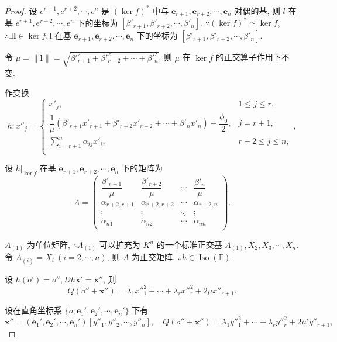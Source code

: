 \documentclass{ctexart}
\begin{document}
\begin{proof}
    设 $e^{r+1},e^{r+2},\cdots,e^n$ 是 $(\ker f)^*$ 中与 $\boldsymbol{e}_{r+1},\boldsymbol{e}_{r+2},\cdots,\boldsymbol{e}_n$ 对偶的基, 则 $l$ 在基 $e^{r+1},e^{r+2},\cdots,e^n$ 下的坐标为 $[\beta'_{r+1},\beta'_{r+2},\cdots,\beta'_n]$. $\because(\ker f)^*\simeq\ker f$, $\therefore\exists\boldsymbol{l}\in\ker f,\boldsymbol{l}$ 在基 $\boldsymbol{e}_{r+1},\boldsymbol{e}_{r+2},\cdots,\boldsymbol{e}_n$ 下的坐标为 $[\beta'_{r+1},\beta'_{r+2},\cdots,\beta'_n]$.
    
    令 $\mu=\|\boldsymbol{l}\|=\sqrt{\beta'^2_{r+1}+\beta'^2_{r+2}+\cdots+\beta'^2_n}$, 则 $\mu$ 在 $\ker f$ 的正交算子作用下不变.

    作变换
    \[h:x''_j=\begin{cases}
        x'_j, & 1\leq j\leq r, \\
        \dfrac{1}{\mu}(\beta'_{r+1}x'_{r+1}+\beta'_{r+2}x'_{r+2}+\cdots+\beta'_nx'_n)+\dfrac{\phi_0}{2}, & j=r+1, \\
        \sum\limits_{i=r+1}^n\alpha_{ij}x'_i, & r+2\leq j\leq n, \\
    \end{cases},\]

    设 $h|_{\ker f}$ 在基 $\boldsymbol{e}_{r+1},\boldsymbol{e}_{r+2},\cdots,\boldsymbol{e}_n$ 下的矩阵为
    \[A=\begin{pmatrix}
        \dfrac{\beta'_{r+1}}{\mu} & \dfrac{\beta'_{r+2}}{\mu} & \cdots & \dfrac{\beta'_n}{\mu} \\
        \alpha_{r+2,r+1} & \alpha_{r+2,r+2} & \cdots & \alpha_{r+2,n} \\
        \vdots & \vdots & \ddots & \vdots \\
        \alpha_{n1} & \alpha_{n2} & \cdots & \alpha_{nn} \\
    \end{pmatrix}.\]

    $A_{(1)}$ 为单位矩阵, $\therefore A_{(1)}$ 可以扩充为 $K^n$ 的一个标准正交基 $A_{(1)},X_2,X_3,\cdots,X_n$. 令 $A_{(i)}=X_i\ (i=2,\cdots,n)$, 则 $A$ 为正交矩阵. $\therefore h\in\operatorname{Iso}(\mathbb{E})$.

    设 $h(\dot{o}')=\dot{o}'',Dh\boldsymbol{x}'=\boldsymbol{x}''$, 则
    \[Q(\dot{o}''+\boldsymbol{x}'')=\lambda_1x''^2_1+\cdots+\lambda_rx''^2_r+2\mu x''_{r+1}.\]

    设在直角坐标系 $\{\dot{o},\boldsymbol{e}_1',\boldsymbol{e}_2',\cdots,\boldsymbol{e}_n'\}$ 下有
    \[\boldsymbol{x}''=(\boldsymbol{e}_1',\boldsymbol{e}_2',\cdots,\boldsymbol{e}_n')[y''_1,y''_2,\cdots,y''_n],\quad Q(\dot{o}''+\boldsymbol{x}'')=\lambda_1y''^2_1+\cdots+\lambda_ry''^2_r+2\mu' y''_{r+1},\]


\end{proof}
\end{document}
